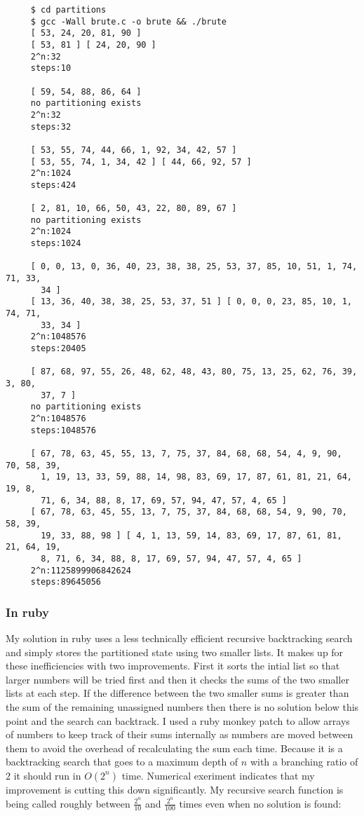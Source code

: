 \documentclass[11pt]{article}
\begin{document}
\begin{verbatim}
     $ cd partitions
     $ gcc -Wall brute.c -o brute && ./brute
     [ 53, 24, 20, 81, 90 ]
     [ 53, 81 ] [ 24, 20, 90 ]
     2^n:32
     steps:10
     
     [ 59, 54, 88, 86, 64 ]
     no partitioning exists
     2^n:32
     steps:32
     
     [ 53, 55, 74, 44, 66, 1, 92, 34, 42, 57 ]
     [ 53, 55, 74, 1, 34, 42 ] [ 44, 66, 92, 57 ]
     2^n:1024
     steps:424
     
     [ 2, 81, 10, 66, 50, 43, 22, 80, 89, 67 ]
     no partitioning exists
     2^n:1024
     steps:1024
     
     [ 0, 0, 13, 0, 36, 40, 23, 38, 38, 25, 53, 37, 85, 10, 51, 1, 74, 71, 33,
       34 ]
     [ 13, 36, 40, 38, 38, 25, 53, 37, 51 ] [ 0, 0, 0, 23, 85, 10, 1, 74, 71,
       33, 34 ]
     2^n:1048576
     steps:20405
     
     [ 87, 68, 97, 55, 26, 48, 62, 48, 43, 80, 75, 13, 25, 62, 76, 39, 3, 80,
       37, 7 ]
     no partitioning exists
     2^n:1048576
     steps:1048576
     
     [ 67, 78, 63, 45, 55, 13, 7, 75, 37, 84, 68, 68, 54, 4, 9, 90, 70, 58, 39,
       1, 19, 13, 33, 59, 88, 14, 98, 83, 69, 17, 87, 61, 81, 21, 64, 19, 8,
       71, 6, 34, 88, 8, 17, 69, 57, 94, 47, 57, 4, 65 ]
     [ 67, 78, 63, 45, 55, 13, 7, 75, 37, 84, 68, 68, 54, 9, 90, 70, 58, 39,
       19, 33, 88, 98 ] [ 4, 1, 13, 59, 14, 83, 69, 17, 87, 61, 81, 21, 64, 19,
       8, 71, 6, 34, 88, 8, 17, 69, 57, 94, 47, 57, 4, 65 ]
     2^n:1125899906842624
     steps:89645056
\end{verbatim}

    
\subsubsection*{In ruby}
\label{sec-1.2.2}

    My solution in ruby uses a less technically efficient recursive
    backtracking search and simply stores the partitioned state using
    two smaller lists. It makes up for these inefficiencies with two
    improvements.  First it sorts the intial list so that larger
    numbers will be tried first and then it checks the sums of the two
    smaller lists at each step.  If the difference between the two
    smaller sums is greater than the sum of the remaining unassigned
    numbers then there is no solution below this point and the search
    can backtrack.  I used a ruby monkey patch to allow arrays of
    numbers to keep track of their sums internally as numbers are
    moved between them to avoid the overhead of recalculating the sum
    each time.  Because it is a backtracking search that goes to a
    maximum depth of $n$ with a branching ratio of $2$ it should run
    in $O(2^n)$ time.  Numerical exeriment indicates that my
    improvement is cutting this down significantly.  My recursive
    search function is being called roughly between $\frac{2^n}{10}$
    and $\frac{2^n}{100}$ times even when no solution is found:
    
\end{document}
